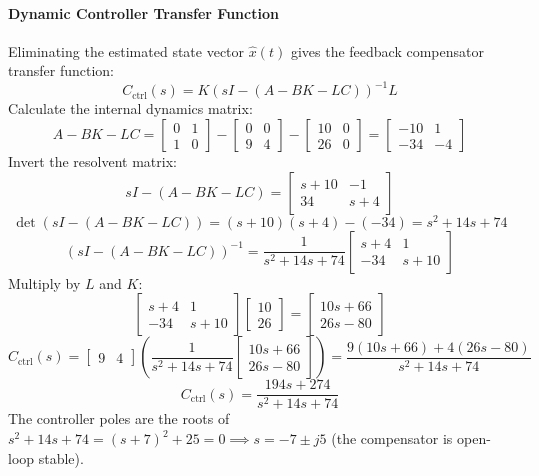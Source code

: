 \documentclass[12pt,onecolumn,twoside ]{article}
\begin{document}
	\paragraph{Dynamic Controller Transfer Function}
	Eliminating the estimated state vector $\hat{x}(t)$ gives the feedback compensator transfer function: \[
	C_{\text{ctrl}}(s) = K \left( sI - (A - BK - LC) \right)^{-1} L
	\]
	Calculate the internal dynamics matrix: \[
	A - BK - LC = \begin{bmatrix} 0 & 1 \\ 1 & 0 \end{bmatrix} - \begin{bmatrix} 0 & 0 \\ 9 & 4 \end{bmatrix} - \begin{bmatrix} 10 & 0 \\ 26 & 0 \end{bmatrix} = \begin{bmatrix} -10 & 1 \\ -34 & -4 \end{bmatrix}
	\]
	Invert the resolvent matrix: \[
	sI - (A - BK - LC) = \begin{bmatrix} s + 10 & -1 \\ 34 & s + 4 \end{bmatrix}
	\] \[
	\det(sI - (A - BK - LC)) = (s + 10)(s + 4) - (-34) = s^2 + 14s + 74
	\] \[
	(sI - (A - BK - LC))^{-1} = \frac{1}{s^2 + 14s + 74} \begin{bmatrix} s + 4 & 1 \\ -34 & s + 10 \end{bmatrix}
	\]
	Multiply by $L$ and $K$: \[
	\begin{bmatrix} s + 4 & 1 \\ -34 & s + 10 \end{bmatrix} \begin{bmatrix} 10 \\ 26 \end{bmatrix} = \begin{bmatrix} 10s + 66 \\ 26s - 80 \end{bmatrix}
	\] \[
	C_{\text{ctrl}}(s) = \begin{bmatrix} 9 & 4 \end{bmatrix} \left( \frac{1}{s^2 + 14s + 74} \begin{bmatrix} 10s + 66 \\ 26s - 80 \end{bmatrix} \right) = \frac{9(10s + 66) + 4(26s - 80)}{s^2 + 14s + 74}
	\] \[
	C_{\text{ctrl}}(s) = \frac{194s + 274}{s^2 + 14s + 74}
	\]
	The controller poles are the roots of $s^2 + 14s + 74 = (s + 7)^2 + 25 = 0 \implies s = -7 \pm j5$ (the compensator is open-loop stable).
	
\end{document}
